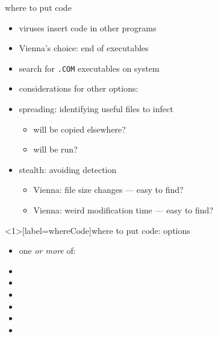 
\begin{frame}{where to put code}
    \begin{itemize}
    \item viruses insert code in other programs
    \item Vienna's choice: end of executables
    \item search for \texttt{.COM} executables on system
    \vspace{.5cm}
    \item considerations for other options:
    \item spreading: identifying useful files to infect
        \begin{itemize}
        \item will be copied elsewhere?
        \item will be run?
        \end{itemize}
    \item stealth: avoiding detection
        \begin{itemize}
        \item Vienna: file size changes --- easy to find?
        \item Vienna: weird modification time --- easy to find?
        \end{itemize}
    \end{itemize}
\end{frame}

\begin{frame}<1>[label=whereCode]{where to put code: options}
    \begin{itemize}
    \item one \textit{or more} of:
    \item {}
    \item {}
    \item {}
    \item {}
    \item {}
    \item {}
    \end{itemize}
\end{frame}

